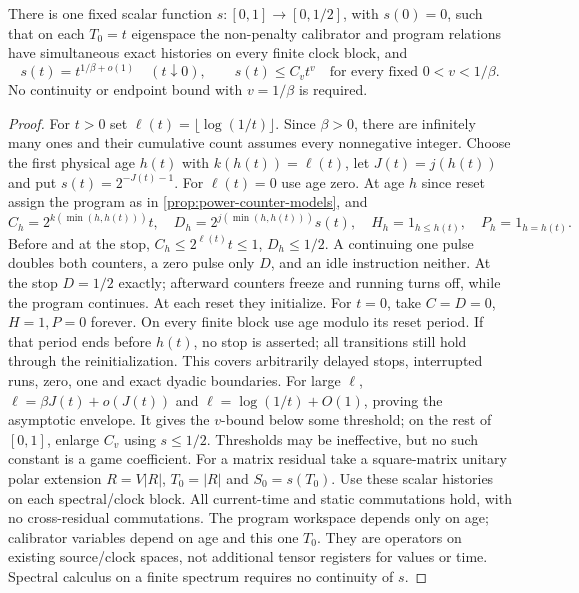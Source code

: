 \begin{proposition}\label{prop:power-upper-histories}
There is one fixed scalar function $s:[0,1]\to[0,1/2]$, with $s(0)=0$, such that on each $T_0=t$ eigenspace the non-penalty calibrator and program relations have simultaneous exact histories on every finite clock block, and
\[
 s(t)=t^{1/\beta+o(1)}\quad(t\downarrow0),\qquad
 s(t)\le C_vt^v\quad\text{for every fixed }0<v<1/\beta.
\]
No continuity or endpoint bound with $v=1/\beta$ is required.
\end{proposition}
\begin{proof}
For $t>0$ set $\ell(t)=\lfloor\log(1/t)\rfloor$. Since $\beta>0$, there are infinitely many ones and their cumulative count assumes every nonnegative integer. Choose the first physical age $h(t)$ with $k(h(t))=\ell(t)$, let $J(t)=j(h(t))$ and put $s(t)=2^{-J(t)-1}$. For $\ell(t)=0$ use age zero. At age $h$ since reset assign the program as in \cref{prop:power-counter-models}, and
\[
 C_h=2^{k(\min(h,h(t)))}t,\quad D_h=2^{j(\min(h,h(t)))}s(t),\quad
 H_h=1_{h\le h(t)},\quad P_h=1_{h=h(t)}.
\]
Before and at the stop, $C_h\le2^{\ell(t)}t\le1$, $D_h\le1/2$. A continuing one pulse doubles both counters, a zero pulse only $D$, and an idle instruction neither. At the stop $D=1/2$ exactly; afterward counters freeze and running turns off, while the program continues. At each reset they initialize. For $t=0$, take $C=D=0$, $H=1,P=0$ forever.
On every finite block use age modulo its reset period. If that period ends before $h(t)$, no stop is asserted; all transitions still hold through the reinitialization. This covers arbitrarily delayed stops, interrupted runs, zero, one and exact dyadic boundaries.
For large $\ell$, $\ell=\beta J(t)+o(J(t))$ and $\ell=\log(1/t)+O(1)$, proving the asymptotic envelope. It gives the $v$-bound below some threshold; on the rest of $[0,1]$, enlarge $C_v$ using $s\le1/2$. Thresholds may be ineffective, but no such constant is a game coefficient.
For a matrix residual take a square-matrix unitary polar extension $R=V|R|$, $T_0=|R|$ and $S_0=s(T_0)$. Use these scalar histories on each spectral/clock block. All current-time and static commutations hold, with no cross-residual commutations. The program workspace depends only on age; calibrator variables depend on age and this one $T_0$. They are operators on existing source/clock spaces, not additional tensor registers for values or time. Spectral calculus on a finite spectrum requires no continuity of $s$.
\end{proof}

